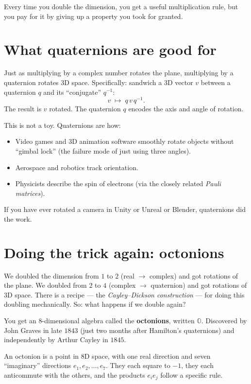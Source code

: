 \documentclass[11pt]{article}
\newcommand{\OO}{\mathbb{O}}
\begin{document}
Every time you double the dimension, you get a useful multiplication
rule, but you pay for it by giving up a property you took for
granted.

\section*{What quaternions are good for}

Just as multiplying by a complex number rotates the plane,
multiplying by a quaternion rotates $3$D space. Specifically:
sandwich a $3$D vector $v$ between a quaternion $q$ and its
``conjugate'' $q^{-1}$:
\[
v \;\mapsto\; q\,v\,q^{-1} .
\]
The result is $v$ rotated. The quaternion $q$ encodes the axis and
angle of rotation.

This is not a toy. Quaternions are how:
\begin{itemize}[leftmargin=*, itemsep=2pt]
  \item Video games and $3$D animation software smoothly rotate
        objects without ``gimbal lock'' (the failure mode of just
        using three angles).
  \item Aerospace and robotics track orientation.
  \item Physicists describe the spin of electrons (via the closely
        related \emph{Pauli matrices}).
\end{itemize}

If you have ever rotated a camera in Unity or Unreal or Blender,
quaternions did the work.

\section*{Doing the trick again: octonions}

We doubled the dimension from $1$ to $2$ (real $\to$ complex) and
got rotations of the plane. We doubled from $2$ to $4$ (complex
$\to$ quaternion) and got rotations of $3$D space. There is a
recipe --- the \emph{Cayley--Dickson construction} --- for doing
this doubling mechanically. So: what happens if we double again?

You get an $8$-dimensional algebra called the \textbf{octonions},
written $\OO$. Discovered by John Graves in late $1843$ (just two
months after Hamilton's quaternions) and independently by Arthur
Cayley in $1845$.

An octonion is a point in $8$D space, with one real direction and
seven ``imaginary'' directions $e_1, e_2, \dots, e_7$. They each
square to $-1$, they each anticommute with the others, and the
products $e_i e_j$ follow a specific rule.
\end{document}
